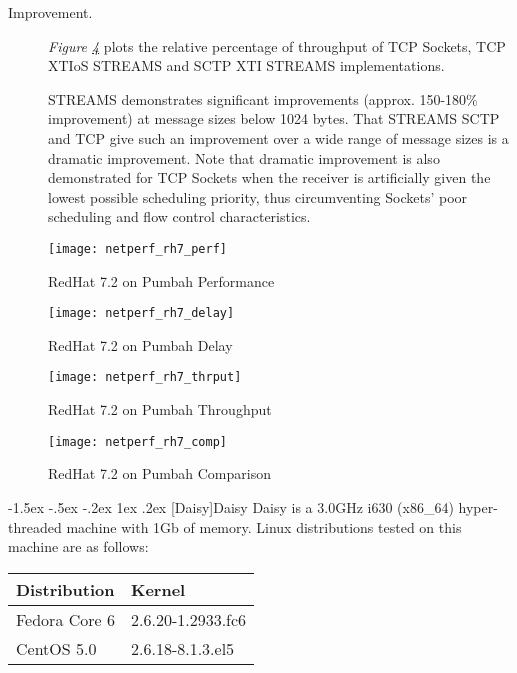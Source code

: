 \documentclass[letterpaper,final,notitlepage,twocolumn,10pt,twoside]{article}
\makeatletter
\renewcommand\subsection{\@startsection{subsection}{2}{\z@}%
                                     {-1.5ex \@plus -.5ex \@minus -.2ex}%
                                     {1ex \@plus .2ex}%
                                     {\normalfont\normalsize\bfseries}}
\makeatother
\begin{document}
\begin{description}
\item[Improvement.]

\textit{Figure \ref{figure:rh7comp}}
plots the relative percentage of throughput of TCP Sockets, TCP XTIoS STREAMS and SCTP XTI STREAMS
implementations.

STREAMS demonstrates significant improvements (approx. 150-180\% improvement) at message sizes below
1024 bytes.  That STREAMS SCTP and TCP give such an improvement over a wide range of message sizes
is a dramatic improvement.  Note that dramatic improvement is also demonstrated for TCP Sockets when
the receiver is artificially given the lowest possible scheduling priority, thus circumventing
Sockets' poor scheduling and flow control characteristics.

\end{description}

\begin{figure}[p]
\center\texttt{[image: netperf\_rh7\_perf]}
\caption[RedHat 7.2 on Pumbah Performance]{RedHat 7.2 on Pumbah Performance}
\label{figure:rh7perf}
\end{figure}

\begin{figure}[p]
\center\texttt{[image: netperf\_rh7\_delay]}
\caption[RedHat 7.2 on Pumbah Delay]{RedHat 7.2 on Pumbah Delay}
\label{figure:rh7dly}
\end{figure}

\begin{figure}[p]
\center\texttt{[image: netperf\_rh7\_thrput]}
\caption[RedHat 7.2 on Pumbah Throughput]{RedHat 7.2 on Pumbah Throughput}
\label{figure:rh7thrput}
\end{figure}

\begin{figure}[p]
\center\texttt{[image: netperf\_rh7\_comp]}
\caption[RedHat 7.2 on Pumbah Comparison]{RedHat 7.2 on Pumbah Comparison}
\label{figure:rh7comp}
\end{figure}

\subsection[Daisy]{Daisy}
Daisy is a 3.0GHz i630 (x86\_64) hyper-threaded machine with 1Gb of memory.
Linux distributions tested on this machine are as follows:

\small
\setlength{\tabcolsep}{0.4em}
\setlength{\arraycolsep}{0.4em}
\begin{tabular}{ll}\\
Distribution & Kernel\\
\hline
Fedora Core 6 & 2.6.20-1.2933.fc6\\
CentOS 5.0 & 2.6.18-8.1.3.el5\\
\end{tabular}\\[1.0ex]
\end{document}
